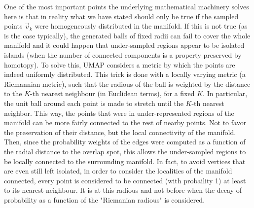 \documentclass[11pt, a4paper, twoside]{article} %
\DeclareRobustCommand{\mybox}[2][gray!10]{%
\begin{tcolorbox}[   %
        left=0.2cm,
        right=0.2cm,
        top=0.15cm,
        bottom=0.15cm,
        colback=#1,
        colframe=#1,
        width=\dimexpr\textwidth\relax, 
        enlarge left by=0mm,
        boxsep=5pt,
        arc=0pt,outer arc=0pt,
        ]
        #2
\end{tcolorbox}
}
\begin{document}
\mybox{One of the most important points the underlying mathematical machinery solves here is that in reality what we have stated should only be true if the sampled points $\vec{v}_k$ were homogeneously distributed in the manifold. If this is not true (as is the case typically), the generated balls of fixed radii can fail to cover the whole manifold and it could happen that under-sampled regions appear to be isolated islands (when the number of connected components is a property preserved by homotopy). To solve this, UMAP considers a metric by which the points are indeed uniformly distributed. This trick is done with a locally varying metric (a Riemannian metric), such that the radious of the ball is weighted by the distance to the $K$-th nearest neighbour (in Euclidean terms), for a fixed $K$. In particular, the unit ball around each point is made to stretch until the $K$-th nearest neighbor. This way, the points that were in under-represented regions of the manifold can be more fairly connected to the rest of nearby points. Not to favor the preservation of their distance, but the local connectivity of the manifold. Then, since the probability weights of the edges were computed as a function of the radial distance to the overlap spot, this allows the under-sampled regions to be locally connected to the surrounding manifold. In fact, to avoid vertices that are even still left isolated, in order to consider the localities of the manifold connected, every point is considered to be connected (with probaility 1) at least to its nearest neighbour. It is at this radious and not before when the decay of probability as a function of the "Riemanian radious" is considered.\\ %

}
\end{document}
